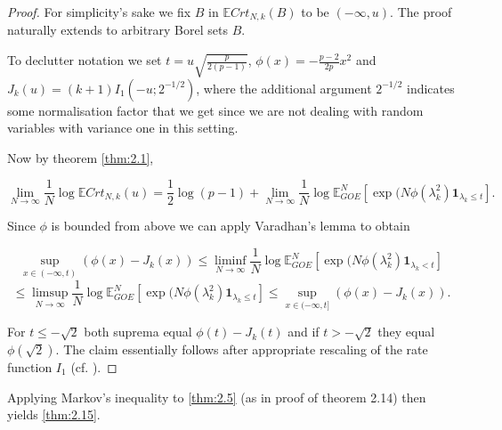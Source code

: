 \begin{proof}
	For simplicity's sake we fix $B$ in $\mathbb E Crt_{N,k}(B)$ to be $(-\infty,u)$. The proof naturally extends to arbitrary Borel sets $B$.
	
	To declutter notation we set $t=u\sqrt{\frac{p}{2(p-1)}}$, $\phi(x)=-\frac{p-2}{2p}x^2$ and $J_k(u)=(k+1)I_1(-u;2^{-1/2})$, where the additional argument $2^{-1/2}$ indicates some normalisation factor that we get since we are not dealing with random variables with variance one in this setting.
	
	Now by theorem \ref{thm:2.1},
	
	$$\lim_{N\rightarrow\infty}\frac{1}{N}\log\mathbb E Crt_{N,k}(u) = 
	\frac{1}{2}\log(p-1) + \lim_{N\rightarrow\infty}\frac{1}{N}\log\mathbb E_{GOE}^N[\exp(N\phi(\lambda_k^2)\mathbf 1_{\lambda_k\leq t}].$$
	
	Since $\phi$ is bounded from above we can apply Varadhan's lemma to obtain
	
	$$\sup_{x\in(-\infty,t)}(\phi(x)-J_k(x))\leq\liminf_{N\rightarrow\infty}\frac{1}{N}\log\mathbb E_{GOE}^N[\exp(N\phi(\lambda_k^2)\mathbf 1_{\lambda_k<t}]$$
	$$\leq\limsup_{N\rightarrow\infty}\frac{1}{N}\log\mathbb E_{GOE}^N[\exp(N\phi(\lambda_k^2)\mathbf 1_{\lambda_k\leq t}]\leq\sup_{x\in(-\infty,t]}(\phi(x)-J_k(x)).$$
	
	For $t\leq-\sqrt 2$ both suprema equal $\phi(t)-J_k(t)$ and if $t>-\sqrt 2$ they equal $\phi(\sqrt 2)$. The claim essentially follows after appropriate rescaling of the rate function $I_1$ (cf. \cite{Cerny10}).
\end{proof}

Applying Markov's inequality to \eqref{thm:2.5} (as in \cite{Cerny10} proof of theorem 2.14) then yields \eqref{thm:2.15}.
